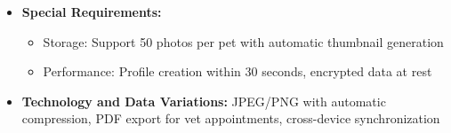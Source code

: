 \begin{itemize}
\begin{itemize}
        \item 4a. Photo upload fails or exceeds limit: System compresses or allows later upload
        \item 5a. Database save fails: System retries and notifies user
    \end{itemize}
    \item \textbf{Special Requirements:}
    \begin{itemize}
        \item Storage: Support 50 photos per pet with automatic thumbnail generation
        \item Performance: Profile creation within 30 seconds, encrypted data at rest
    \end{itemize}
    \item \textbf{Technology and Data Variations:} JPEG/PNG with automatic compression, PDF export for vet appointments, cross-device synchronization
\end{itemize}

